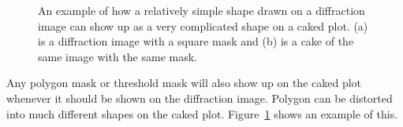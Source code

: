 \begin{figure}[htb]
    \caption{An example of how a relatively simple
    shape drawn on a diffraction image can show
    up as a very complicated shape on a caked
    plot. (a) is a diffraction image with a square 
    mask and (b) is a cake of the same image with 
    the same mask.}
    \label{box_mask}
\end{figure}

Any polygon mask or threshold mask will also show 
up on the caked plot whenever it should be shown
on the diffraction image. Polygon can be distorted
into much different shapes on the caked plot. 
Figure~\ref{box_mask} shows an example of this.



